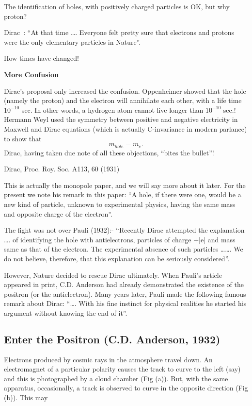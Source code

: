 The identification of holes, with positively charged particles is OK, but why proton?

Dirac~:	“At that time …. Everyone felt pretty sure that electrons and protons were the only elementary particles in Nature”.

How times have changed!

\textbf{More Confusion}

Dirac’s proposal only increased the confusion. Oppenheimer showed that the hole (namely the proton) and the electron will annihilate each other, with a life time $10^{-10}$ sec. In other words, a hydrogen atom cannot live longer than $10^{-10}$ sec.! Hermann Weyl used the symmetry between positive and negative electricity in Maxwell and Dirac equations (which is actually C-invariance in modern parlance) to show that 
$$
m_{hole} = m_{e}.
$$
Dirac, having taken due note of all these objections, “bites the bullet”!
\begin{center}
Dirac, Proc. Roy. Soc. A113, 60 (1931)
\end{center}

This is actually the monopole paper, and we will say more about it later. For the present we note his remark in this paper: “A hole, if there were one, would be a new kind of particle, unknown to experimental physics, having the same mass and opposite charge of the electron”.

The fight was not over Pauli (1932):- 	“Recently Dirac attempted the explanation …. of identifying the hole with antielectrons, particles of charge +|e| and mass same as that of the electron. The experimental absence of such particles ……. We do not believe, therefore, that this explanation can be seriously considered”.
	
However, Nature decided to rescue Dirac ultimately. When Pauli’s article appeared in print, C.D. Anderson had already demonstrated the existence of the positron (or the antielectron). Many years later, Pauli made the following famous remark about Dirac: “…. With his fine instinct for physical realities he started his argument without knowing the end of it”.

\subsection{Enter the Positron (C.D. Anderson, 1932)}

Electrons produced by cosmic rays in the atmosphere travel down. An electromagnet of a particular polarity causes the track to curve to the left (say) and this is photographed by a cloud chamber (Fig (a)). But, with the same apparatus, occasionally, a track is observed to curve in the opposite direction (Fig (b)). This may      

